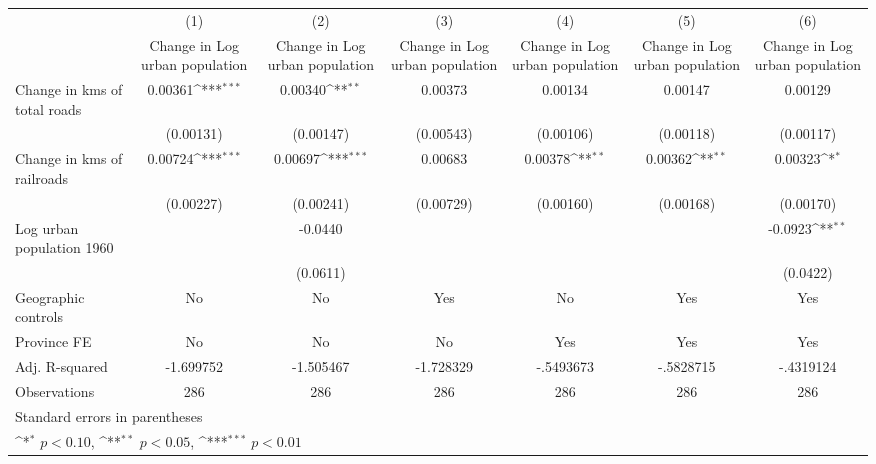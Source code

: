 {
\def\sym#1{\ifmmode^{#1}\else\(^{#1}\)\fi}
\begin{tabular}{l*{6}{c}}
\hline\hline
                    &\multicolumn{1}{c}{(1)}&\multicolumn{1}{c}{(2)}&\multicolumn{1}{c}{(3)}&\multicolumn{1}{c}{(4)}&\multicolumn{1}{c}{(5)}&\multicolumn{1}{c}{(6)}\\
                    &\multicolumn{1}{c}{Change in Log urban population}&\multicolumn{1}{c}{Change in Log urban population}&\multicolumn{1}{c}{Change in Log urban population}&\multicolumn{1}{c}{Change in Log urban population}&\multicolumn{1}{c}{Change in Log urban population}&\multicolumn{1}{c}{Change in Log urban population}\\
\hline
Change in kms of total roads&     0.00361\sym{***}&     0.00340\sym{**} &     0.00373         &     0.00134         &     0.00147         &     0.00129         \\
                    &   (0.00131)         &   (0.00147)         &   (0.00543)         &   (0.00106)         &   (0.00118)         &   (0.00117)         \\
[1em]
Change in kms of railroads&     0.00724\sym{***}&     0.00697\sym{***}&     0.00683         &     0.00378\sym{**} &     0.00362\sym{**} &     0.00323\sym{*}  \\
                    &   (0.00227)         &   (0.00241)         &   (0.00729)         &   (0.00160)         &   (0.00168)         &   (0.00170)         \\
[1em]
Log urban population 1960&                     &     -0.0440         &                     &                     &                     &     -0.0923\sym{**} \\
                    &                     &    (0.0611)         &                     &                     &                     &    (0.0422)         \\
\hline
Geographic controls &          No         &          No         &         Yes         &          No         &         Yes         &         Yes         \\
Province FE         &          No         &          No         &          No         &         Yes         &         Yes         &         Yes         \\
Adj. R-squared      &   -1.699752         &   -1.505467         &   -1.728329         &   -.5493673         &   -.5828715         &   -.4319124         \\
Observations        &         286         &         286         &         286         &         286         &         286         &         286         \\
\hline\hline
\multicolumn{7}{l}{\footnotesize Standard errors in parentheses}\\
\multicolumn{7}{l}{\footnotesize \sym{*} \(p<0.10\), \sym{**} \(p<0.05\), \sym{***} \(p<0.01\)}\\
\end{tabular}
}
